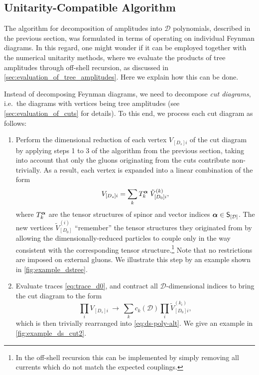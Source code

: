 \subsection{Unitarity-Compatible Algorithm}
\label{dshel:sec:unitarity-compatible}

The algorithm for decomposition of amplitudes into $\mathcal{D}$ polynomials, 
described in the previous section, was formulated 
in terms of operating on individual Feynman diagrams.
In this regard, one might wonder if it can be employed together with
the numerical unitarity methods, where we evaluate
the products of tree amplitudes through off-shell recursion, 
as discussed in \cref{sec:evaluation_of_tree_amplitudes}.
Here we explain how this can be done.

Instead of decomposing Feynman diagrams, 
we need to decompose \emph{cut diagrams}, 
i.e.\ the diagrams with vertices being tree amplitudes 
(see \cref{sec:evaluation_of_cuts} for details).
To this end, we process each cut diagram as follows:
\begin{enumerate}
  \item Perform the dimensional reduction of each vertex $V_{[D_s]i}$ of the cut diagram by applying steps 1 to 3 of the algorithm from the previous section,
    taking into account that only the gluons originating from the cuts contribute non-trivially.
    As a result, each vertex is expanded into a linear combination of the form
    \begin{equation}
      V_{[D_s]i} = \sum_k T_k^{\vb*{\alpha}} \; \tilde{V}_{[D_0]i}^{(k)},
    \end{equation}
    where $T_k^{\vb*{\alpha}}$ are the tensor structures of spinor and vector indices $\vb*{\alpha} \in \mathsf{S}_{[\mathcal{D}]}$.
    The new vertices $\tilde{V}_{[D_0]}^{(i)}$ ``remember'' 
    the tensor structures they originated from by allowing the dimensionally-reduced particles 
    to couple only in the way consistent with the corresponding tensor structure.\footnote{
      In the off-shell recursion this can be implemented by simply removing all currents which do not match the expected couplings.
    }
    Note that no restrictions are imposed on external gluons.
    We illustrate this step by an example shown in \cref{fig:example_dstree}.

  \item Evaluate traces \eqref{eq:trace_d0}, and contract all $\mathcal{D}$-dimensional indices
    to bring the cut diagram to the form
    \begin{equation}
      \prod_i V_{[D_s]i} ~\to~  \sum_k c_k(\mathcal{D}) \prod_i \tilde{V}_{[D_0]i}^{(k_i)},
    \end{equation}
    which is then trivially rearranged into \cref{eq:ds-poly-alt}.  We give an example in \cref{fig:example_ds_cut2}.
\end{enumerate}

